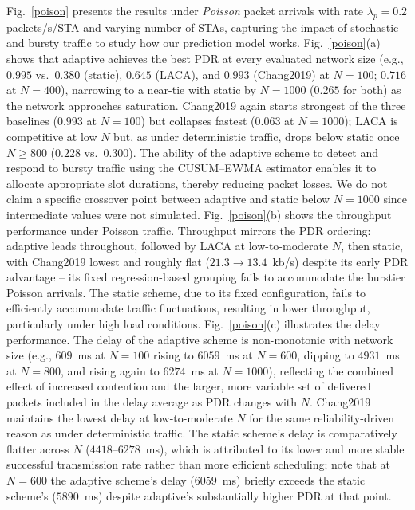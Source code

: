\documentclass[journal]{IEEEtran}
\newcommand{\rev}[1]{{\color{blue}#1}}
\newcommand{\new}[1]{{\color{red}#1}}
\begin{document}
Fig.~\ref{poison} presents the results under \textit{Poisson} packet arrivals \rev{with rate $\lambda_p=0.2$ packets/s/STA} and varying number of STAs, capturing the impact of stochastic and bursty traffic to study how our prediction model works. Fig.~\ref{poison}(a) shows that adaptive achieves the best PDR at every evaluated network size \new{(e.g., $0.995$ vs.\ $0.380$ (static), $0.645$ (LACA), and $0.993$ (Chang2019) at $N=100$; $0.716$ at $N=400$)}, narrowing to a near-tie with static by $N=1000$ ($0.265$ for both) as the network approaches saturation. \new{Chang2019 again starts strongest of the three baselines ($0.993$ at $N=100$) but collapses fastest ($0.063$ at $N=1000$); LACA is competitive at low $N$ but, as under deterministic traffic, drops below static once $N\ge800$ ($0.228$ vs.\ $0.300$).} The ability of the adaptive scheme to detect and respond to bursty traffic using the CUSUM--EWMA estimator enables it to allocate appropriate slot durations, thereby reducing packet losses. \new{We do not claim a specific crossover point between adaptive and static below $N=1000$ since intermediate values were not simulated.} Fig.~\ref{poison}(b) shows the throughput performance under Poisson traffic. \new{Throughput mirrors the PDR ordering: adaptive leads throughout, followed by LACA at low-to-moderate $N$, then static, with Chang2019 lowest and roughly flat ($21.3\to13.4$~kb/s) despite its early PDR advantage -- its fixed regression-based grouping fails to accommodate the burstier Poisson arrivals.} The static scheme, due to its fixed configuration, fails to efficiently accommodate traffic fluctuations, resulting in lower throughput, particularly under high load conditions. Fig.~\ref{poison}(c) illustrates the delay performance. \new{The delay of the adaptive scheme is non-monotonic with network size (e.g., $609$~ms at $N=100$ rising to $6059$~ms at $N=600$, dipping to $4931$~ms at $N=800$, and rising again to $6274$~ms at $N=1000$), reflecting the combined effect of increased contention and the larger, more variable set of delivered packets included in the delay average as PDR changes with $N$. Chang2019 maintains the lowest delay at low-to-moderate $N$ for the same reliability-driven reason as under deterministic traffic. The static scheme's delay is comparatively flatter across $N$ ($4418$--$6278$~ms), which is attributed to its lower and more stable successful transmission rate rather than more efficient scheduling; note that at $N=600$ the adaptive scheme's delay ($6059$~ms) briefly exceeds the static scheme's ($5890$~ms) despite adaptive's substantially higher PDR at that point.}
\end{document}
